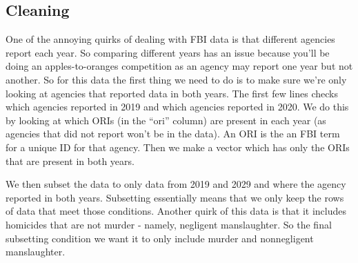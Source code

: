 \documentclass[
]{krantz}
\makeatletter
\newenvironment{Shaded}{\begin{snugshade}}{\end{snugshade}}
\newcommand{\DecValTok}[1]{\textcolor[rgb]{0.06,0.06,0.06}{#1}}
\newcommand{\NormalTok}[1]{#1}
\newcommand{\OtherTok}[1]{\textcolor[rgb]{0.37,0.37,0.37}{#1}}
\newcommand{\SpecialCharTok}[1]{\textcolor[rgb]{0,0,0}{#1}}
\newcommand{\StringTok}[1]{\textcolor[rgb]{0.5,0.5,0.5}{#1}}
\newenvironment{kframe}{%
\medskip{}
\setlength{\fboxsep}{.8em}
 \def\at@end@of@kframe{}%
 \ifinner\ifhmode%
  \def\at@end@of@kframe{\end{minipage}}%
  \begin{minipage}{\columnwidth}%
 \fi\fi%
 \def\FrameCommand##1{\hskip\@totalleftmargin \hskip-\fboxsep
 \colorbox{shadecolor}{##1}\hskip-\fboxsep
     \hskip-\linewidth \hskip-\@totalleftmargin \hskip\columnwidth}%
 \MakeFramed {\advance\hsize-\width
   \@totalleftmargin\z@ \linewidth\hsize
   \@setminipage}}%
 {\par\unskip\endMakeFramed%
 \at@end@of@kframe}
\renewenvironment{Shaded}{\begin{kframe}}{\end{kframe}}
\makeatother
\begin{document}
\hypertarget{cleaning}{%
\subsection{Cleaning}\label{cleaning}}

One of the annoying quirks of dealing with FBI data is that different agencies report each year. So comparing different years has an issue because you'll be doing an apples-to-oranges competition as an agency may report one year but not another. So for this data the first thing we need to do is to make sure we're only looking at agencies that reported data in both years. The first few lines checks which agencies reported in 2019 and which agencies reported in 2020. We do this by looking at which ORIs (in the ``ori'' column) are present in each year (as agencies that did not report won't be in the data). An ORI is the an FBI term for a unique ID for that agency. Then we make a vector which has only the ORIs that are present in both years.

We then subset the data to only data from 2019 and 2029 and where the agency reported in both years. Subsetting essentially means that we only keep the rows of data that meet those conditions. Another quirk of this data is that it includes homicides that are not murder - namely, negligent manslaughter. So the final subsetting condition we want it to only include murder and nonnegligent manslaughter.

\begin{Shaded}
\end{Shaded}
\end{document}
